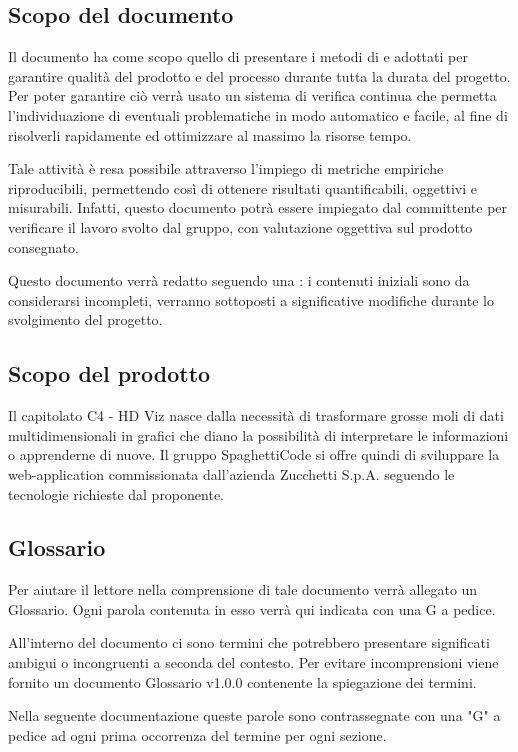 \documentclass[../piano_di_qualifica.tex]{subfiles}
\begin{document}
\subsection{Scopo del documento}
Il documento ha come scopo quello di presentare i metodi di  e  adottati per garantire qualità del prodotto e del processo durante tutta la durata del progetto. Per poter garantire ciò verrà usato un sistema di verifica continua che permetta l'individuazione di eventuali problematiche in modo automatico e facile, al fine di risolverli rapidamente ed ottimizzare al massimo la risorse tempo.

Tale attività è resa possibile attraverso l’impiego di metriche empiriche riproducibili, permettendo così di ottenere risultati quantificabili, oggettivi e misurabili. Infatti, questo documento potrà essere impiegato dal committente per verificare il lavoro svolto dal gruppo, con valutazione oggettiva sul prodotto consegnato.

Questo documento verrà redatto seguendo una : i contenuti iniziali sono da considerarsi incompleti, verranno sottoposti a significative modifiche  durante lo svolgimento del progetto.

\subsection{Scopo del prodotto}
Il capitolato C4 - HD Viz nasce dalla necessità di trasformare grosse moli di dati multidimensionali in grafici che diano la possibilità di interpretare le informazioni o apprenderne di nuove. Il gruppo SpaghettiCode si offre quindi di sviluppare la web-application commissionata dall’azienda Zucchetti S.p.A. seguendo le tecnologie richieste dal proponente.

\subsection{Glossario}
Per aiutare il lettore nella comprensione di tale documento verrà allegato un Glossario. Ogni parola contenuta in esso verrà qui indicata con una G a pedice.

All'interno del documento ci sono termini che potrebbero presentare significati ambigui o incongruenti a seconda del contesto. Per evitare incomprensioni viene fornito un documento Glossario v1.0.0 contenente la spiegazione dei termini.

Nella seguente documentazione queste parole sono contrassegnate con una "G" a pedice ad ogni prima occorrenza del termine per ogni sezione.
\end{document}
